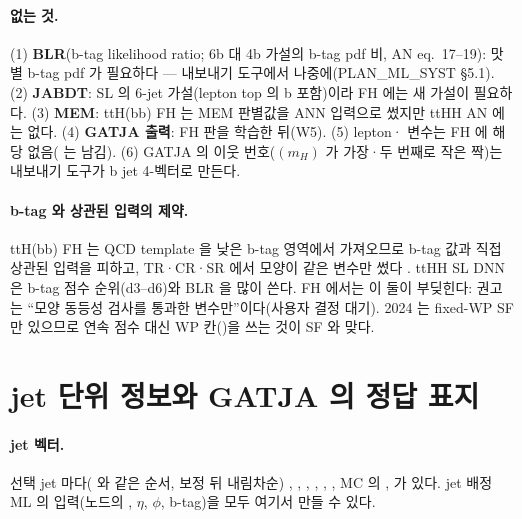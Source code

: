 \paragraph{없는 것.}
(1) \textbf{BLR}(b-tag likelihood ratio; 6b 대 4b 가설의 b-tag pdf 비, AN eq.\ 17--19): 맛별 b-tag pdf 가
필요하다 — 내보내기 도구에서 나중에(PLAN\_ML\_SYST §5.1). (2) \textbf{JABDT}: SL 의 6-jet 가설(lepton top 의 b 포함)이라 FH 에는 새 가설이 필요하다.
(3) \textbf{MEM}: ttH(bb) FH 는 MEM 판별값을 ANN 입력으로 썼지만 ttHH AN 에는 없다. (4) \textbf{GATJA 출력}: FH 판을
학습한 뒤(W5). (5) lepton·\MET{} 변수는 FH 에 해당 없음( 는 남김). (6) GATJA 의 이웃 번호(\chisq$(m_H)$ 가 가장·두 번째로 작은 짝)는 내보내기
도구가 b jet 4-벡터로 만든다.

\paragraph{b-tag 와 상관된 입력의 제약.}
ttH(bb) FH 는 QCD template 을 낮은 b-tag 영역에서 가져오므로 b-tag 값과 직접 상관된 입력을 피하고, TR·CR·SR 에서 모양이 같은 변수만 썼다
. ttHH SL DNN 은 b-tag 점수 순위(d3–d6)와 BLR 을 많이 쓴다. FH 에서는 이 둘이 부딪힌다:
권고는 ``모양 동등성 검사를 통과한 변수만''이다(사용자 결정 대기)\tagopen{}. 2024 는 fixed-WP SF 만 있으므로 연속 점수 대신
WP 칸()을 쓰는 것이 SF 와 맞다.

\section{jet 단위 정보와 GATJA 의 정답 표지}\label{sec:reco-gen}

\paragraph{jet 벡터.}
선택 jet 마다( 와 같은 순서, 보정 뒤 \pt{} 내림차순) , , , , ,
, MC 의 ,  가 있다. jet 배정 ML 의 입력(노드의 \pt, $\eta$, $\phi$, b-tag)을 모두 여기서 만들 수 있다.

